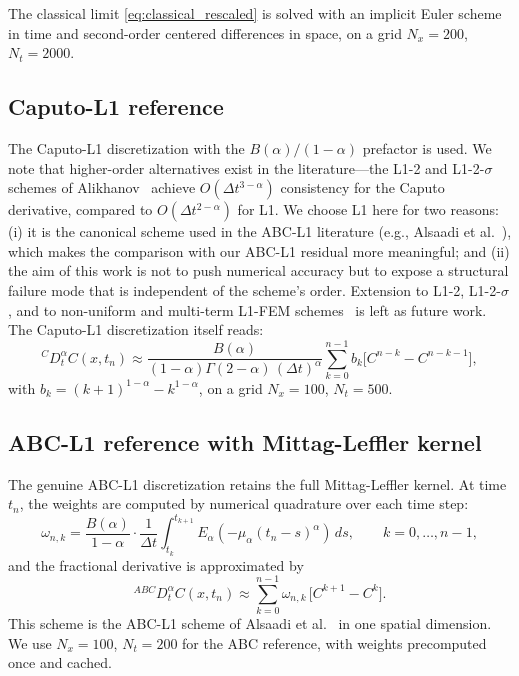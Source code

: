 \documentclass[11pt]{article}
\begin{document}
The classical limit \eqref{eq:classical_rescaled} is solved with an implicit Euler scheme in time and second-order centered differences in space, on a grid \(N_x=200\), \(N_t=2000\).

\subsection{Caputo-L1 reference}

The Caputo-L1 discretization \cite{Podlubny1999} with the \(B(\alpha)/(1-\alpha)\) prefactor is used. We note that higher-order alternatives exist in the literature---the L1-2 and L1-2-\(\sigma\) schemes of Alikhanov~\cite{Alikhanov2016} achieve \(O(\Delta t^{3-\alpha})\) consistency for the Caputo derivative, compared to \(O(\Delta t^{2-\alpha})\) for L1. We choose L1 here for two reasons: (i) it is the canonical scheme used in the ABC-L1 literature (e.g., Alsaadi et al.~\cite{Alsaadi2026}), which makes the comparison with our ABC-L1 residual more meaningful; and (ii) the aim of this work is not to push numerical accuracy but to expose a structural failure mode that is independent of the scheme's order. Extension to L1-2, L1-2-\(\sigma\), and to non-uniform and multi-term L1-FEM schemes~\cite{Tan2026} is left as future work. The Caputo-L1 discretization itself reads:
\begin{equation}
{}^{C}D_t^\alpha C(x,t_n) \approx \frac{B(\alpha)}{(1-\alpha)\Gamma(2-\alpha)\,(\Delta t)^\alpha}
\sum_{k=0}^{n-1} b_k \bigl[C^{n-k}-C^{n-k-1}\bigr],
\end{equation}
with \(b_k = (k+1)^{1-\alpha} - k^{1-\alpha}\), on a grid \(N_x=100\), \(N_t=500\).

\subsection{ABC-L1 reference with Mittag-Leffler kernel}
\label{sec:abc_ref}

The genuine ABC-L1 discretization retains the full Mittag-Leffler kernel. At time \(t_n\), the weights are computed by numerical quadrature over each time step:
\begin{equation}
\omega_{n,k} = \frac{B(\alpha)}{1-\alpha}\cdot\frac{1}{\Delta t}
\int_{t_k}^{t_{k+1}} E_\alpha\!\left(-\mu_\alpha (t_n-s)^\alpha\right)\,ds,
\qquad k = 0,\dots,n-1,
\label{eq:abc_weights}
\end{equation}
and the fractional derivative is approximated by
\begin{equation}
{}^{ABC}D_t^\alpha C(x,t_n) \approx \sum_{k=0}^{n-1} \omega_{n,k}\,\bigl[C^{k+1}-C^k\bigr].
\end{equation}
This scheme is the ABC-L1 scheme of Alsaadi et al.~\cite{Alsaadi2026} in one spatial dimension. We use \(N_x=100\), \(N_t=200\) for the ABC reference, with weights precomputed once and cached.
\end{document}
